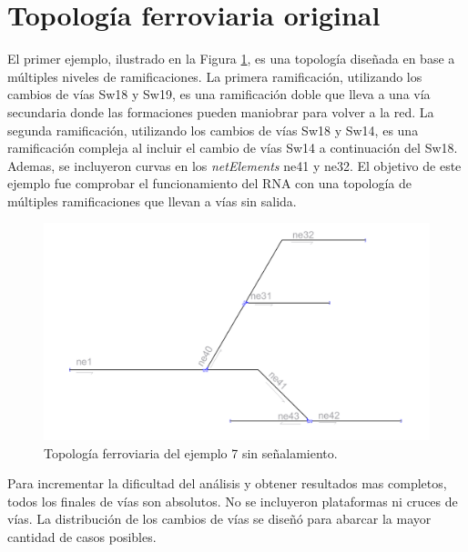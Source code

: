 \section{Topología ferroviaria original}

	El primer ejemplo, ilustrado en la Figura \ref{fig:EJ7_1}, es una topología diseñada en base a múltiples niveles de ramificaciones. La primera ramificación, utilizando los cambios de vías Sw18 y Sw19, es una ramificación doble que lleva a una vía secundaria donde las formaciones pueden maniobrar para volver a la red. La segunda ramificación, utilizando los cambios de vías Sw18 y Sw14, es una ramificación compleja al incluir el cambio de vías Sw14 a continuación del Sw18. Ademas, se incluyeron curvas en los \textit{netElements} ne41 y ne32. El objetivo de este ejemplo fue comprobar el funcionamiento del RNA con una topología de múltiples ramificaciones que llevan a vías sin salida.	
	
	\begin{figure}[h]
		\centering
		\includegraphics[width=1\textwidth]{resultados-obtenidos/ejemplo7/images/7_empty.png}
		\centering\caption{Topología ferroviaria del ejemplo 7 sin señalamiento.}
		\label{fig:EJ7_1}
	\end{figure}
	
	Para incrementar la dificultad del análisis y obtener resultados mas completos, todos los finales de vías son absolutos. No se incluyeron plataformas ni cruces de vías. La distribución de los cambios de vías se diseñó para abarcar la mayor cantidad de casos posibles.